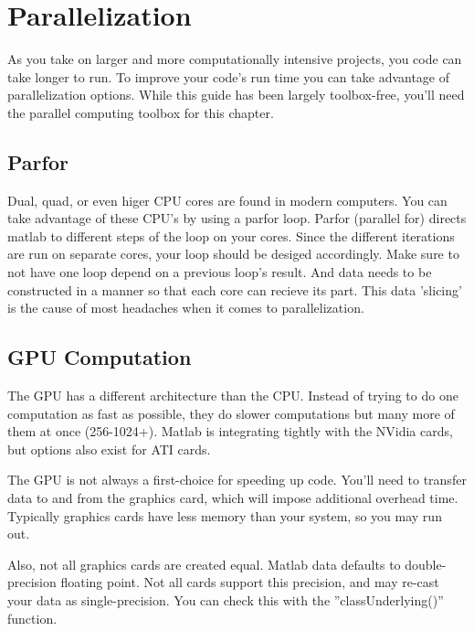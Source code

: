 
\pagebreak
\section{Parallelization}
As you take on larger and more computationally intensive projects, you code can take longer to run.
 To improve your code's run time you can take advantage of parallelization options.
 While this guide has been largely toolbox-free, you'll need the parallel computing toolbox for this chapter.

\subsection{Parfor}
Dual, quad, or even higer CPU cores are found in modern computers.
 You can take advantage of these CPU's by using a parfor loop.
 Parfor (parallel for) directs matlab to different steps of the loop on your cores.
 Since the different iterations are run on separate cores, your loop should be desiged accordingly.
 Make sure to not have one loop depend on a previous loop's result.
 And data needs to be constructed in a manner so that each core can recieve its part.
 This data 'slicing' is the cause of most headaches when it comes to parallelization.

\begin{quote}

\end{quote}

\pagebreak
\subsection{GPU Computation}
The GPU has a different architecture than the CPU.
 Instead of trying to do one computation as fast as possible, they do slower computations but many more of them at once (256-1024+).
 Matlab is integrating tightly with the NVidia cards, but options also exist for ATI cards.

The GPU is not always a first-choice for speeding up code.
 You'll need to transfer data to and from the graphics card, which will impose additional overhead time.
 Typically graphics cards have less memory than your system, so you may run out.

Also, not all graphics cards are created equal.
 Matlab data defaults to double-precision floating point.
 Not all cards support this precision, and may re-cast your data as single-precision.
 You can check this with the ''classUnderlying()'' function.

\begin{quote}
 
\end{quote}

